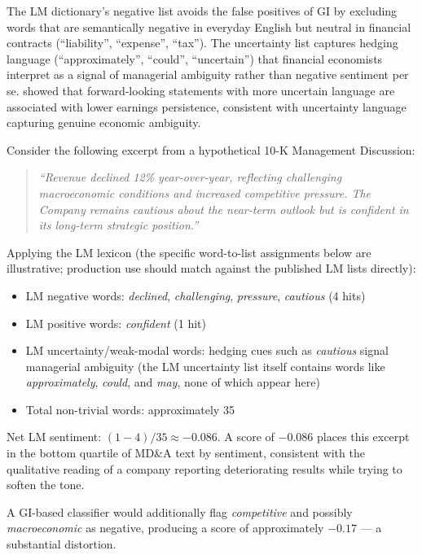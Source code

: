 The LM dictionary's negative list avoids the false positives of GI by excluding words that are semantically negative in everyday English but neutral in financial contracts (``liability'', ``expense'', ``tax''). The uncertainty list captures hedging language (``approximately'', ``could'', ``uncertain'') that financial economists interpret as a signal of managerial ambiguity rather than negative sentiment per se. \citet{li2010information} showed that forward-looking statements with more uncertain language are associated with lower earnings persistence, consistent with uncertainty language capturing genuine economic ambiguity.

\begin{example}
\label{ex:lm-example}
Consider the following excerpt from a hypothetical 10-K Management Discussion:

\begin{quote}
\textit{``Revenue declined 12\% year-over-year, reflecting challenging macroeconomic conditions and increased competitive pressure. The Company remains cautious about the near-term outlook but is confident in its long-term strategic position.''}
\end{quote}

Applying the LM lexicon (the specific word-to-list assignments below are illustrative;
production use should match against the published LM lists directly):
\begin{itemize}
  \item LM negative words: \textit{declined}, \textit{challenging}, \textit{pressure}, \textit{cautious} (4 hits)
  \item LM positive words: \textit{confident} (1 hit)
  \item LM uncertainty/weak-modal words: hedging cues such as \textit{cautious} signal
        managerial ambiguity (the LM uncertainty list itself contains words like
        \textit{approximately}, \textit{could}, and \textit{may}, none of which appear here)
  \item Total non-trivial words: approximately 35
\end{itemize}

Net LM sentiment: $(1 - 4) / 35 \approx -0.086$. A score of $-0.086$ places this excerpt in the bottom quartile of MD\&A text by sentiment, consistent with the qualitative reading of a company reporting deteriorating results while trying to soften the tone.

A GI-based classifier would additionally flag \textit{competitive} and possibly \textit{macroeconomic} as negative, producing a score of approximately $-0.17$ — a substantial distortion.
\end{example}

